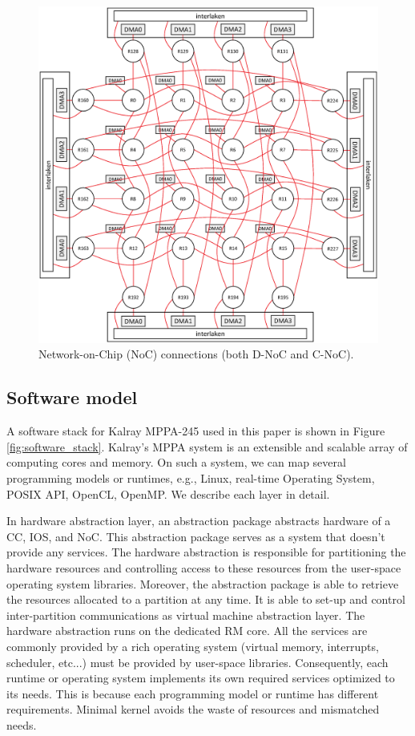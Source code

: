 \documentclass{sig-alternate-05-2015}
\begin{document}
\begin{figure}[t]
  \centering
  \includegraphics[width=1.0\linewidth]{../figure/noc_map.eps}
  \caption{\label{fig:noc_map}
    Network-on-Chip (NoC) connections (both D-NoC and C-NoC).}
\end{figure}

\subsection{Software model}
\label{sec:software_model}
A software stack for Kalray MPPA-245 used in this paper is shown in Figure \ref{fig:software_stack}.
Kalray's MPPA system is an extensible and scalable array of computing cores and memory.
On such a system, we can map several programming models or runtimes, e.g., Linux, real-time Operating System, POSIX API, OpenCL, OpenMP.
We describe each layer in detail.

In hardware abstraction layer, an abstraction package abstracts hardware of a CC, IOS, and NoC.
This abstraction package serves as a system that doesn't provide any services.
The hardware abstraction is responsible for partitioning the hardware resources and controlling access to these resources from the user-space operating system libraries.
Moreover, the abstraction package is able to retrieve the resources allocated to a partition at any time.
It is able to set-up and control inter-partition communications as virtual machine abstraction layer.
The hardware abstraction runs on the dedicated RM core.
All the services are commonly provided by a rich operating system (virtual memory, interrupts, scheduler, etc...) must be provided by user-space libraries.
Consequently, each runtime or operating system implements its own required services optimized to its needs.
This is because each programming model or runtime has different requirements.
Minimal kernel avoids the waste of resources and mismatched needs.
\end{document}
